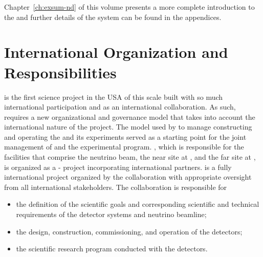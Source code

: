 Chapter~\ref{ch:exsum-nd} of this  volume presents a more complete introduction to the  and further details of the system can be found in the appendices. 

\section{International Organization and Responsibilities}

 is the first science project in the USA of this scale built with so much
international participation and as an international collaboration. As such,  requires a new organizational and governance model that takes into account the international nature of the project.
The
model used by  to manage constructing and operating the  and its experiments served as a starting point for the joint management of  and the  experimental program.  
, which is responsible for the facilities that comprise the neutrino beam, the near site at , and the far site at \surf{}, is organized as a
- project incorporating international partners. 
 is a fully international project
organized by the  collaboration with appropriate oversight from all international stakeholders.
The  collaboration is responsible for
\begin{itemize}
\item the definition of the scientific goals and corresponding scientific and technical requirements of the detector systems and neutrino beamline;
\item the design, construction, commissioning, and operation of the detectors; 
\item the scientific research program conducted with the  detectors. 
\end{itemize}

